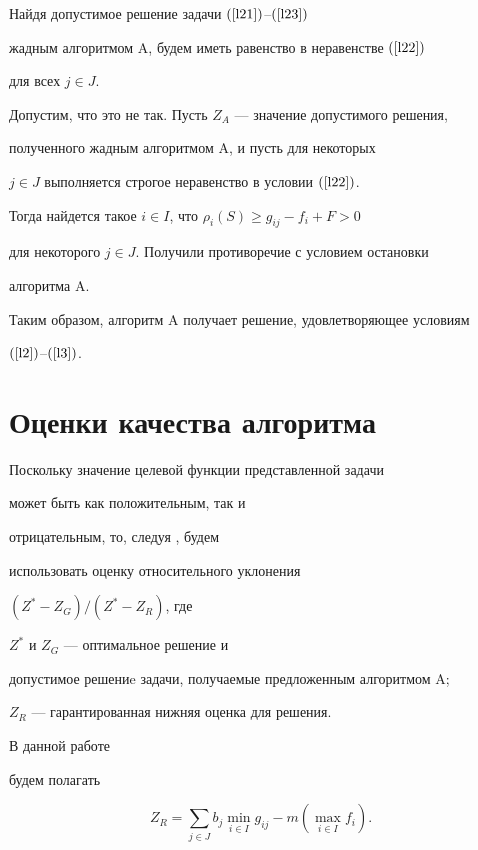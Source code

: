 \begin{pf}


Найдя допустимое решение задачи $(\ref{l21})$--$(\ref{l23})$


жадным алгоритмом A, будем иметь равенство в неравенстве $(\ref{l22})$


для всех $j \in J$.


Допустим, что это не так. Пусть $Z_A$ --- значение допустимого решения, 


полученного жадным алгоритмом A, и пусть для некоторых


$j \in J$ выполняется строгое неравенство в условии $(\ref{l22})$.


Тогда найдется такое $i \in I$, что $\rho_i(S) \ge g_{ij} -f_i +F > 0$


для некоторого $j \in J$. Получили противоречие с условием остановки 


алгоритма A. 


Таким образом, алгоритм A получает решение, удовлетворяющее условиям


$(\ref{l2})$--$(\ref{l3})$.


\end{pf}





\section{Оценки качества алгоритма}





Поскольку значение целевой функции представленной задачи


может быть как положительным, так и 


отрицательным, то, следуя \cite{CFN77}, будем


использовать оценку относительного уклонения 


$(Z^*-Z_G)/(Z^*-Z_R)$, где 


$Z^*$ и $Z_G$ --- оптимальное решение и 


допустимое решениe задачи, получаемые предложенным алгоритмом A; 


$Z_R$ --- гарантированная нижняя оценка для решения.


В данной работе


будем полагать


\begin{equation}


Z_R= \sum_{j \in J}b_j \min_{i \in I}g_{ij}- m(\max_{i \in I}f_{i}).


\end{equation}





